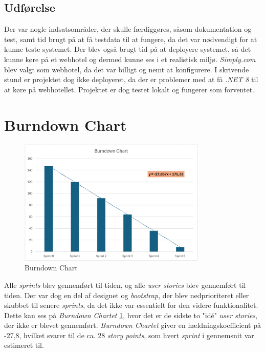 \subsection{Udførelse}
\label{subsec:sprint-6-udforelse}
Der var nogle indsatsområder, der skulle færdiggøres, såsom dokumentation og test, samt tid brugt på at få testdata til at fungere, da det var nødvendigt for at kunne teste systemet.
Der blev også brugt tid på at deployere systemet, så det kunne køre på et webhotel og dermed kunne ses i et realistisk miljø. 
\emph{Simply.com} blev valgt som webhotel, da det var billigt og nemt at konfigurere. 
I skrivende stund er projektet dog ikke deployeret, da der er problemer med at få \emph{.NET 8} til at køre på webhotellet. Projektet er dog testet lokalt og fungerer som forventet.

\section{Burndown Chart}
\label{sec:burndown-chart}
\begin{figure}[H]
    \centering
    \includegraphics[width=0.8\textwidth]{figures/scrum/burndown-chart.png}
    \caption{Burndown Chart}
    \label{fig:burndown-chart}
\end{figure}

Alle \emph{sprints} blev gennemført til tiden, og alle \emph{user stories} blev gennemført til tiden. 
Der var dog en del af designet og \emph{bootstrap}, der blev nedprioriteret eller skubbet til senere \emph{sprints}, da det ikke var essentielt for den videre funktionalitet. 
Dette kan ses på \emph{Burndown Chartet} \cref{fig:burndown-chart}, hvor det er de sidste to "idé" \emph{user stories}, der ikke er blevet gennemført.
\emph{Burndown Chartet} giver en hældningskoefficient på -27,8, hvilket svarer til de ca. 28 \emph{story points}, som hvert \emph{sprint} i gennemsnit var estimeret til.
